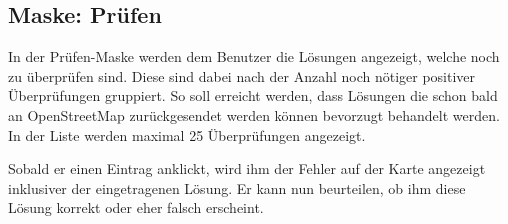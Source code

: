 \subsection{Maske: Prüfen}
In der Prüfen-Maske werden dem Benutzer die Lösungen angezeigt, welche noch zu überprüfen sind.
Diese sind dabei nach der Anzahl noch nötiger positiver Überprüfungen gruppiert.
So soll erreicht werden, dass Lösungen die schon bald an OpenStreetMap zurückgesendet werden können bevorzugt behandelt werden.
In der Liste werden maximal 25 Überprüfungen angezeigt.

Sobald er einen Eintrag anklickt, wird ihm der Fehler auf der Karte angezeigt inklusiver der eingetragenen Lösung.
Er kann nun beurteilen, ob ihm diese Lösung korrekt oder eher falsch erscheint.

\begin{figure}[H]
\hfill
{}

\end{figure}
